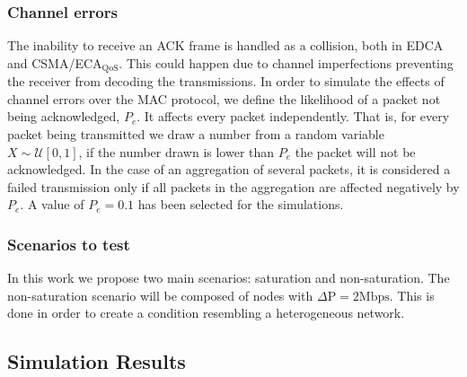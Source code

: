\subsubsection{Channel errors}
The inability to receive an ACK frame is handled as a collision, both in EDCA and CSMA/ECA$_{\text{QoS}}$. This could happen due to channel imperfections preventing the receiver from decoding the transmissions. In order to simulate the effects of channel errors over the MAC protocol, we define the likelihood of a packet not being acknowledged, $P_e$. It affects every packet independently. That is, for every packet being transmitted we draw a number from a random variable $X\sim\mathcal{U}[0,1]$, if the number drawn is lower than $P_e$ the packet will not be acknowledged. In the case of an aggregation of several packets, it is considered a failed transmission only if all packets in the aggregation are affected negatively by $P_e$. A value of $P_e=0.1$ has been selected for the simulations.

\subsubsection{Scenarios to test}
In this work we propose two main scenarios: saturation and non-saturation. The non-saturation scenario will be composed of nodes with $\Delta\text{P}=2\text{Mbps}$. This is done in order to create a condition resembling a heterogeneous network.



\subsection{Simulation Results}\label{sim:results}
